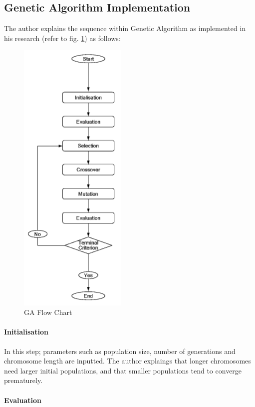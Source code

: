 \subsection{Genetic Algorithm Implementation}

The author explains the sequence within Genetic Algorithm as implemented in his research (refer to fig. \ref{fig:GoGAFC}) as follows:

\begin{figure}[htbp]
\centering
\includegraphics[height=13.5cm]{./Images/24-GoGALoop}
\caption[GA Flow Chart]{GA Flow Chart \cite{kawakita08}}
\label{fig:GoGAFC}
\end{figure}

\paragraph{Initialisation}\mbox{}

In this step; parameters such as population size, number of generations and chromosome length are inputted. The author explaings that longer chromosomes need larger initial populations, and that smaller populations tend to converge prematurely.

\paragraph{Evaluation}\mbox{}

